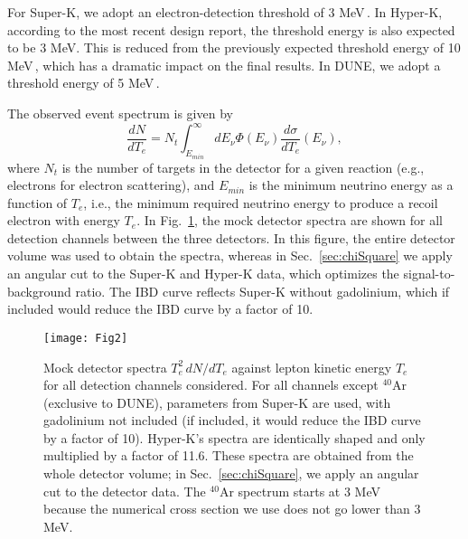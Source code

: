 \documentclass[aps,reprint,superscriptaddress]{revtex4-1}
\begin{document}
For Super-K, we adopt an electron-detection threshold of 3 MeV\,\cite{Abe:2016waf}.  In Hyper-K, according to the most recent design report, the threshold energy is also expected to be 3 MeV.  This is reduced from the previously expected threshold energy of 10 MeV\,\cite{Abe:2011ts}, which has a dramatic impact on the final results.  In DUNE, we adopt a threshold energy of 5 MeV\,\cite{Ankowski:2016lab}.

The observed event spectrum is given by \cite{Laha:2013hva}
\begin{equation} \label{eq:dNdTeScat}
\frac{dN}{dT_{e}}=N_{t}\int_{E_{min}}^{\infty}dE_{\nu}\Phi(E_{\nu})\frac{d\sigma}{dT_{e}}(E_{\nu}),
\end{equation}
where $N_{t}$ is the number of targets in the detector for a given reaction (e.g., electrons for electron scattering), and $E_{min}$ is the minimum neutrino energy as a function of $T_{e}$, i.e., the minimum required neutrino energy to produce a recoil electron with energy $T_{e}$.  In Fig.~\ref{fig:logLogSpectra}, the mock detector spectra are shown for all detection channels between the three detectors.  In this figure, the entire detector volume was used to obtain the spectra, whereas in Sec.~\ref{sec:chiSquare} we apply an angular cut to the Super-K and Hyper-K data, which optimizes the signal-to-background ratio.  The IBD curve reflects Super-K without gadolinium, which if included would reduce the IBD curve by a factor of 10.

\begin{figure}[t]
\centering
\texttt{[image: Fig2]}
\caption{Mock detector spectra $T_e^2 \, dN/dT_e$ against lepton kinetic energy $T_e$ for all detection channels considered. For all channels except ${}^{40}$Ar (exclusive to DUNE), parameters from Super-K are used, with gadolinium not included (if included, it would reduce the IBD curve by a factor of 10). Hyper-K's spectra are identically shaped and only multiplied by a factor of 11.6. These spectra are obtained from the whole detector volume; in Sec.~\ref{sec:chiSquare}, we apply an angular cut to the detector data. The $^{40}$Ar spectrum starts at 3 MeV because the numerical cross section we use does not go lower than 3 MeV.}
\label{fig:logLogSpectra}
\end{figure}
\end{document}
